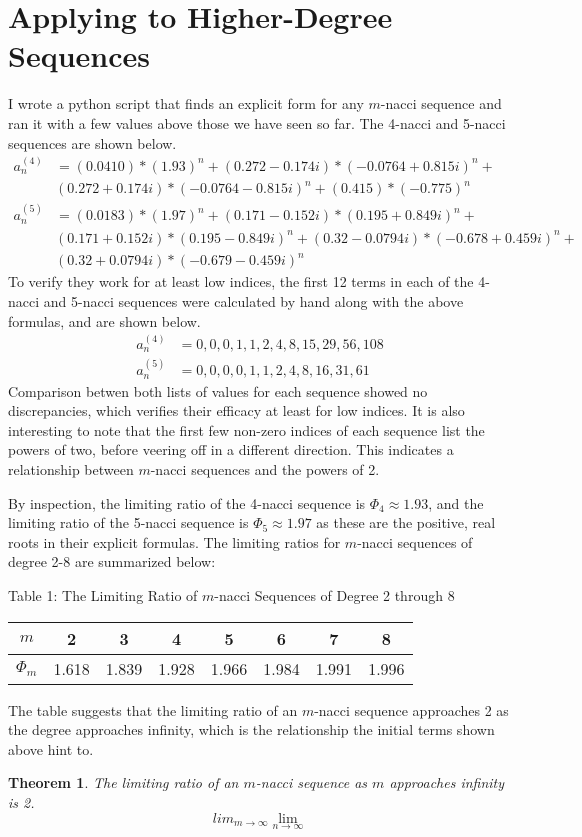 \documentclass[11pt]{article}
\newtheorem{theorem}{Theorem}[section]
\begin{document}
\section{Applying to Higher-Degree Sequences}
I wrote a python script that finds an explicit form for any \(m\)-nacci sequence and ran it with a few values above those we have seen so far. The 4-nacci and 5-nacci sequences are shown below. 
\begin{align*}
    a_n^{(4)} &= (0.0410)*(1.93)^n + (0.272 - 0.174i)*(-0.0764 + 0.815i)^n + \\ &(0.272 + 0.174i)*(-0.0764 - 0.815i)^n + (0.415)*(-0.775)^n \\
    a_n^{(5)} &= (0.0183)*(1.97)^n + (0.171 - 0.152i)*(0.195 + 0.849i)^n + \\ & (0.171 + 0.152i)*(0.195 - 0.849i)^n + (0.32 - 0.0794i)*(-0.678 + 0.459i)^n + \\ & (0.32 + 0.0794i)*(-0.679 - 0.459i)^n
\end{align*}
To verify they work for at least low indices, the first 12 terms in each of the 4-nacci and 5-nacci sequences were calculated by hand along with the above formulas, and are shown below. 
\begin{align*}
    a_{n}^{(4)}&= 0,0,0,1,1,2,4,8,15,29,56,108 \\
    a_{n}^{(5)}&= 0,0,0,0,1,1,2,4,8,16,31,61
\end{align*}
Comparison betwen both lists of values for each sequence showed no discrepancies, which verifies their efficacy at least for low indices. It is also interesting to note that the first few non-zero indices of each sequence list the powers of two, before veering off in a different direction. This indicates a relationship between \(m\)-nacci sequences and the powers of 2.

By inspection, the limiting ratio of the 4-nacci sequence is \(\Phi_{4}\approx1.93\), and the limiting ratio of the 5-nacci sequence is \(\Phi_{5}\approx1.97\) as these are the positive, real roots in their explicit formulas. The limiting ratios for \(m\)-nacci sequences of degree 2-8 are summarized below:
\begin{center}
    Table 1: The Limiting Ratio of \(m\)-nacci Sequences of Degree 2 through 8
    \begin{tabular}{|c|c|c|c|c|c|c|c|} 
     \hline
     \(m\) & 2 & 3 & 4 & 5 & 6 & 7 & 8 \\ 
     \hline
     \(\Phi_m\) & 1.618 & 1.839 & 1.928 & 1.966 & 1.984 & 1.991 & 1.996 \\
     \hline
    \end{tabular}
    \end{center}
The table suggests that the limiting ratio of an \(m\)-nacci sequence approaches 2 as the degree approaches infinity, which is the relationship the initial terms shown above hint to. 
\begin{theorem}
    The limiting ratio of an \(m\)-nacci sequence as \(m\) approaches infinity is 2. 
    \[{lim_{m\to\infty}} \lim_{n\to\infty}\]
\end{theorem}
\end{document}
